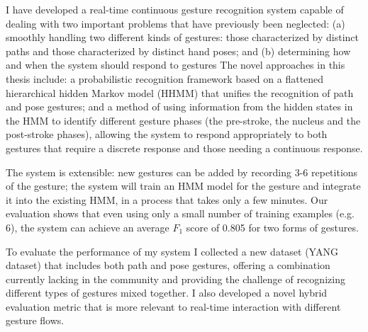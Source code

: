I have developed a real-time continuous gesture recognition system capable of
dealing with two important problems that have previously been neglected:
(a) smoothly handling two different kinds of gestures: those
characterized by distinct paths and those characterized by distinct hand
poses; and (b) determining how and when the system should respond to gestures
The novel approaches in this thesis include: a probabilistic recognition
framework based on a flattened hierarchical hidden Markov model (HHMM) that
unifies the recognition of path and pose gestures;
and a method of using information from the
hidden states in the HMM to identify different
gesture phases (the pre-stroke, the nucleus and the post-stroke
phases), allowing the system to respond appropriately to both gestures that
require a discrete response and those needing a continuous response.

The system is extensible: new gestures can be added by recording 3-6 repetitions
of the gesture; the system will train an HMM model for the gesture
and integrate it into the existing HMM, in a process that takes only a few minutes.
Our evaluation shows that even using only a small number of
training examples (e.g. 6), the system can achieve an average $F_1$ score of
0.805 for
two forms of gestures.

To evaluate the performance of my system I collected a new dataset
(YANG dataset) that includes both path and pose gestures, offering a
combination currently lacking in the community and providing
the challenge of recognizing different types of gestures mixed
together. I also developed a novel hybrid evaluation metric that is
more relevant to real-time interaction with different gesture flows.